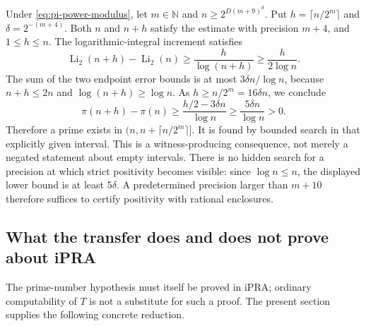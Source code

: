 Under \eqref{eq:pi-power-modulus}, let $m\in\mathbb N$ and
$n\ge2^{D(m+9)^d}$.  Put $h=\lceil n/2^m\rceil$ and
$\delta=2^{-(m+4)}$.  Both $n$ and $n+h$ satisfy the estimate with
precision $m+4$, and $1\le h\le n$.
The logarithmic-integral increment satisfies
\[
 \operatorname{Li}_2(n+h)-\operatorname{Li}_2(n)
 \ge\frac h{\log(n+h)}\ge\frac h{2\log n}.
\]
The sum of the two endpoint error bounds is at most
$3\delta n/\log n$, because $n+h\le2n$ and
$\log(n+h)\ge\log n$.
As $h\ge n/2^m=16\delta n$, we conclude
\[
 \pi(n+h)-\pi(n)
 \ge\frac{h/2-3\delta n}{\log n}
 \ge\frac{5\delta n}{\log n}>0.
\]
Therefore a prime exists in $(n,n+\lceil n/2^m\rceil]$.
It is found by bounded search in that explicitly given interval.
This is a witness-producing consequence, not merely a negated
statement about empty intervals.  There is no hidden search for a
precision at which strict positivity becomes visible: since
$\log n\le n$, the displayed lower bound is at least $5\delta$.
A predetermined precision larger than $m+10$ therefore suffices to
certify positivity with rational enclosures.

\subsection{What the transfer does and does not prove about iPRA}

The prime-number hypothesis must itself be proved in iPRA; ordinary
computability of $T$ is not a substitute for such a proof.
The present section supplies the following concrete reduction.

